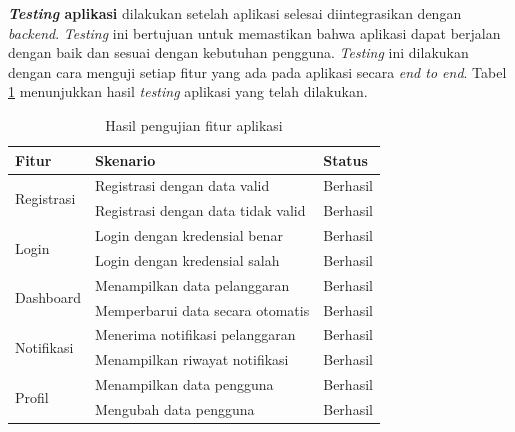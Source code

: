 \textbf{\emph{Testing} aplikasi} dilakukan setelah aplikasi selesai diintegrasikan dengan \emph{backend}. \emph{Testing} ini bertujuan untuk memastikan bahwa aplikasi dapat berjalan dengan baik dan sesuai dengan kebutuhan pengguna. \emph{Testing} ini dilakukan dengan cara menguji setiap fitur yang ada pada aplikasi secara \emph{end to end}. Tabel \ref{tab:testingapp} menunjukkan hasil \emph{testing} aplikasi yang telah dilakukan.

\begin{table}[htbp]
  \centering
  \begin{tabular}{|l|l|l|}
  \hline
  \textbf{Fitur} & \textbf{Skenario} & \textbf{Status} \\
  \hline
  \multirow{2}{*}{Registrasi} & Registrasi dengan data valid & Berhasil \\
  \cline{2-3}
  & Registrasi dengan data tidak valid & Berhasil \\
  \hline
  \multirow{2}{*}{Login} & Login dengan kredensial benar & Berhasil \\
  \cline{2-3}
  & Login dengan kredensial salah & Berhasil \\
  \hline
  \multirow{2}{*}{Dashboard} & Menampilkan data pelanggaran & Berhasil \\
  \cline{2-3}
  & Memperbarui data secara otomatis & Berhasil \\
  \hline
  \multirow{2}{*}{Notifikasi} & Menerima notifikasi pelanggaran & Berhasil \\
  \cline{2-3}
  & Menampilkan riwayat notifikasi & Berhasil \\
  \hline
  \multirow{2}{*}{Profil} & Menampilkan data pengguna & Berhasil \\
  \cline{2-3}
  & Mengubah data pengguna & Berhasil \\
  \hline
  \end{tabular}
  \caption{Hasil pengujian fitur aplikasi}
  \label{tab:testingapp}
\end{table}
